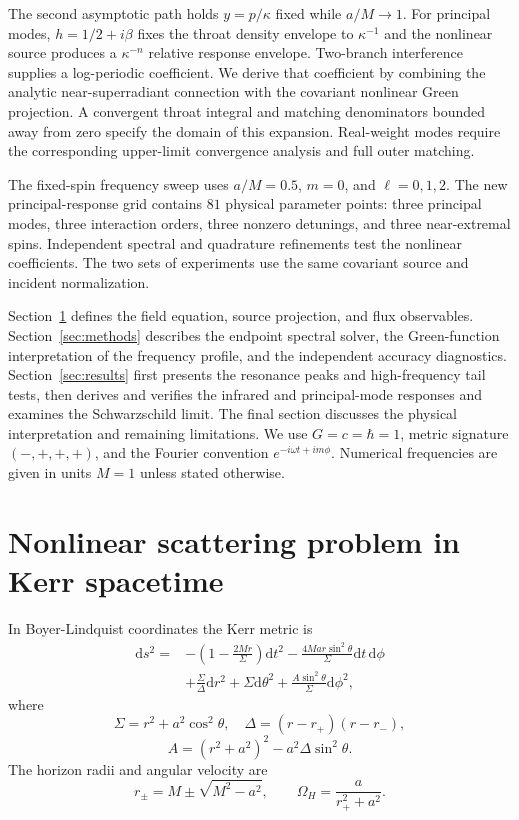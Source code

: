 \documentclass[aps,prd,twocolumn,10pt,nofootinbib,superscriptaddress,floatfix]{revtex4-2}
\newcommand{\dd}{\mathrm{d}}
\newcommand{\rp}{r_+}
\newcommand{\rmn}{r_-}
\newcommand{\DeltaK}{\Delta}
\begin{document}
The second asymptotic path holds $y=p/\kappa$ fixed while $a/M\to1$.
For principal modes, $h=1/2+i\beta$ fixes the throat density envelope to
$\kappa^{-1}$ and the nonlinear source produces a $\kappa^{-n}$ relative
response envelope.  Two-branch interference supplies a log-periodic
coefficient.  We derive that coefficient by combining the analytic
near-superradiant connection\cite{BredbergKerrCFT2010} with the covariant
nonlinear Green projection.  A convergent throat integral and matching
denominators bounded away from zero specify the domain of this expansion.
Real-weight modes require the corresponding upper-limit convergence
analysis and full outer matching.

The fixed-spin frequency sweep uses $a/M=0.5$, $m=0$, and $\ell=0,1,2$.
The new principal-response grid contains $81$ physical parameter points:
three principal modes, three interaction orders, three nonzero detunings,
and three near-extremal spins.  Independent spectral and quadrature
refinements test the nonlinear coefficients.  The two sets of experiments
use the same covariant source and incident normalization.

Section~\ref{sec:problem} defines the field equation, source projection, and
flux observables.  Section~\ref{sec:methods} describes the endpoint spectral
solver, the Green-function interpretation of the frequency profile, and
the independent accuracy diagnostics.  Section~\ref{sec:results} first
presents the resonance peaks and high-frequency tail tests, then derives
and verifies the infrared and principal-mode responses and examines
the Schwarzschild limit.  The final
section discusses the physical interpretation and remaining limitations.
We use $G=c=\hbar=1$, metric signature $(-,+,+,+)$, and the Fourier convention
$e^{-i\omega t+im\phi}$.  Numerical frequencies are given in units $M=1$
unless stated otherwise.
\section{Nonlinear scattering problem in Kerr spacetime}
\label{sec:problem}

In Boyer-Lindquist coordinates the Kerr metric is
\begin{align}
\dd s^2={}&-\left(1-\frac{2Mr}{\Sigma}\right)\dd t^2
-\frac{4Mar\sin^2\theta}{\Sigma}\dd t\,\dd\phi
\nonumber\\
&+\frac{\Sigma}{\DeltaK}\dd r^2+\Sigma\dd\theta^2
+\frac{A\sin^2\theta}{\Sigma}\dd\phi^2 ,
\end{align}
where
\begin{equation}
\Sigma=r^2+a^2\cos^2\theta,\quad
\DeltaK=(r-\rp)(r-\rmn),
\end{equation}
\begin{equation}
A=(r^2+a^2)^2-a^2\DeltaK\sin^2\theta .
\end{equation}
The horizon radii and angular velocity are
\begin{equation}
r_\pm=M\pm\sqrt{M^2-a^2},\qquad
\Omega_H=\frac{a}{\rp^2+a^2}.
\end{equation}
\end{document}
